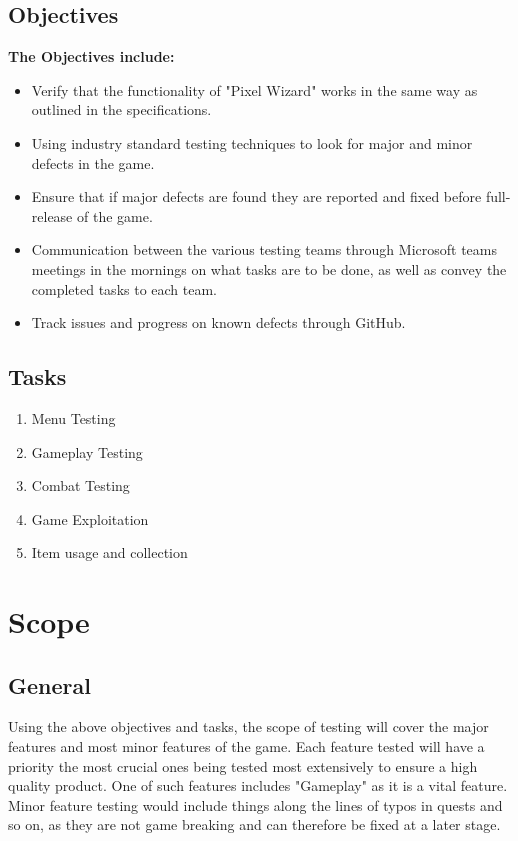 \documentclass[a4paper, 10pt]{article}
\begin{document}
    \subsection{Objectives}
    \textbf{The Objectives include:}
    \begin{itemize}
        \item Verify that the functionality of "Pixel Wizard" works in the same way as outlined in the specifications.
        \item Using industry standard testing techniques to look for major and minor defects in the game.
        \item Ensure that if major defects are found they are reported and fixed before full-release of the game.
        \item Communication between the various testing teams through Microsoft teams meetings in the mornings on what tasks are to be done, as well as convey the completed tasks to each team.
        \item Track issues and progress on known defects through GitHub.
    \end{itemize}
    
    \subsection{Tasks}
        \begin{enumerate}
        \item Menu Testing
        \item Gameplay Testing
        \item Combat Testing
        \item Game Exploitation
        \item Item usage and collection
    \end{enumerate}
    

\section{Scope}
    \subsection{General}
    Using the above objectives and tasks, the scope of testing will cover the major features and most minor features of the game. Each feature tested will have a priority the most crucial ones being tested most extensively to ensure a high quality product. One of such features includes "Gameplay" as it is a vital feature. \newline
    Minor feature testing would include things along the lines of typos in quests and so on, as they are not game breaking and can therefore be fixed at a later stage.
\end{document}
